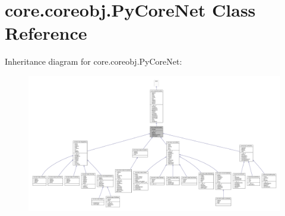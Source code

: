 \hypertarget{classcore_1_1coreobj_1_1_py_core_net}{\section{core.\+coreobj.\+Py\+Core\+Net Class Reference}
\label{classcore_1_1coreobj_1_1_py_core_net}
}


Inheritance diagram for core.\+coreobj.\+Py\+Core\+Net\+:
\nopagebreak
\begin{figure}[H]
\begin{center}
\leavevmode
\includegraphics[width=350pt]{classcore_1_1coreobj_1_1_py_core_net__inherit__graph}
\end{center}
\end{figure}


